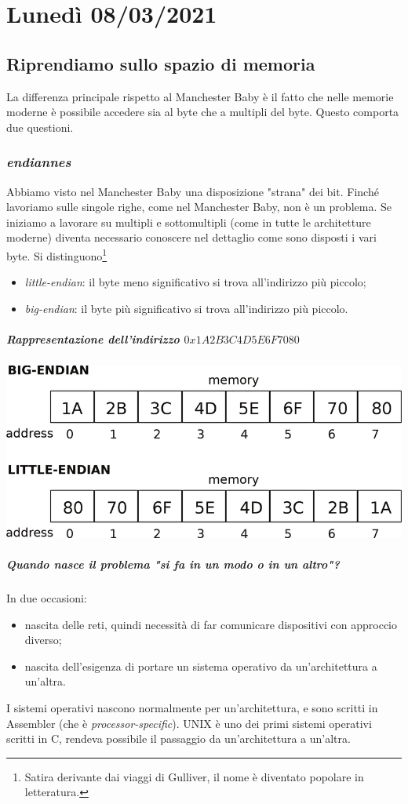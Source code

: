 
\chapter{Lunedì 08/03/2021}
\section{Riprendiamo sullo spazio di memoria}
La differenza principale rispetto al Manchester Baby è il fatto che nelle memorie moderne è possibile accedere sia al byte che a multipli del byte. Questo comporta due questioni.
\subsection{\emph{endiannes}}
Abbiamo visto nel Manchester Baby una disposizione "strana" dei bit. Finché lavoriamo sulle singole righe, come nel Manchester Baby, non è un problema. Se iniziamo a lavorare su multipli e sottomultipli (come in tutte le architetture moderne) diventa necessario conoscere nel dettaglio come sono disposti i vari byte. Si distinguono\footnote{Satira derivante dai viaggi di Gulliver, il nome è diventato popolare in letteratura.} 
\begin{itemize}
	\item \emph{little-endian}: il byte meno significativo si trova all'indirizzo più piccolo;
	\item \emph{big-endian}: il byte più significativo si trova all'indirizzo più piccolo.
\end{itemize}
\paragraph{Rappresentazione dell'indirizzo $0x1A2B3C4D5E6F7080$}
\begin{center}
	\includegraphics[scale=0.60]{img/134.PNG}
\end{center}
\paragraph{Quando nasce il problema "si fa in un modo o in un altro"?} In due occasioni:
\begin{itemize} 
	\item nascita delle reti, quindi necessità di far comunicare dispositivi con approccio diverso;
	\item nascita dell'esigenza di portare un sistema operativo da un'architettura a un'altra.
\end{itemize}
I sistemi operativi nascono normalmente per un'architettura, e sono scritti in Assembler (che è \emph{processor-specific}). UNIX è uno dei primi sistemi operativi scritti in C, rendeva possibile il passaggio da un'architettura a un'altra.  
